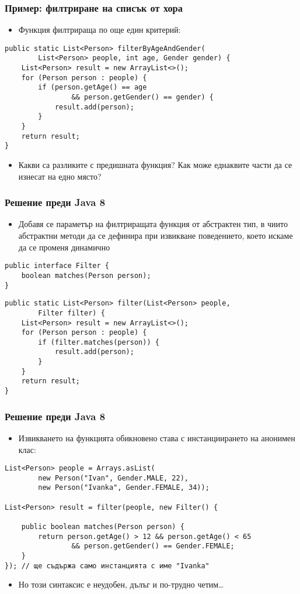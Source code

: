 \documentclass[ignorenonframetext, hyperref=unicode,compress,pdflatex]{beamer}
\begin{document}
\begin{frame}[containsverbatim]\frametitle{Пример: филтриране на списък от хора}
\begin{itemize}
  \item Функция филтрираща по още един критерий:
\end{itemize}
\begin{lstlisting}
public static List<Person> filterByAgeAndGender(
		List<Person> people, int age, Gender gender) {
	List<Person> result = new ArrayList<>();
	for (Person person : people) {
		if (person.getAge() == age
				&& person.getGender() == gender) {
			result.add(person);
		}
	}
	return result;
}
\end{lstlisting}
\begin{itemize}
  \item Какви са разликите с предишната функция? Как може еднаквите части да се
  изнесат на едно място?
\end{itemize}
\end{frame}

\begin{frame}[containsverbatim]\frametitle{Решение преди Java 8}
\begin{itemize}
  \item Добавя се параметър на филтриращата функция от абстрактен тип, в чиито
  абстрактни методи да се дефинира при извикване поведението, което искаме да се
  променя динамично
\end{itemize}
\begin{lstlisting}
public interface Filter {
	boolean matches(Person person);
}
\end{lstlisting}
\begin{lstlisting}
public static List<Person> filter(List<Person> people,
		Filter filter) {
	List<Person> result = new ArrayList<>();
	for (Person person : people) {
		if (filter.matches(person)) {
			result.add(person);
		}
	}
	return result;
}
\end{lstlisting}
\end{frame}

\begin{frame}[containsverbatim]\frametitle{Решение преди Java 8}
\begin{itemize}
  \item Извикването на функцията обикновено става с
  инстанциирането на анонимен клас:
\end{itemize}
\begin{lstlisting}
List<Person> people = Arrays.asList(
		new Person("Ivan", Gender.MALE, 22),
		new Person("Ivanka", Gender.FEMALE, 34));

List<Person> result = filter(people, new Filter() {

	public boolean matches(Person person) {
		return person.getAge() > 12 && person.getAge() < 65
				&& person.getGender() == Gender.FEMALE;
	}
}); // ще съдържа само инстанцията с име "Ivanka"
\end{lstlisting}
\begin{itemize}
  \item Но този синтаксис е неудобен, дълъг и по-трудно четим\ldots
\end{itemize}
\end{frame}
\end{document}
